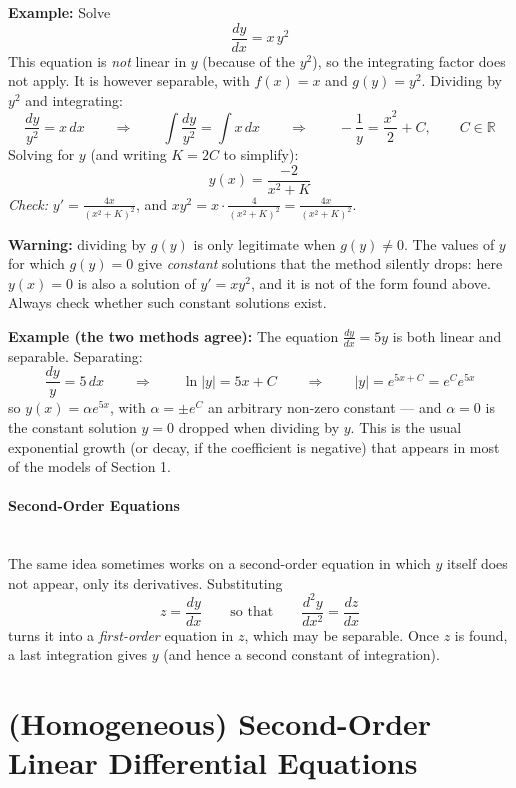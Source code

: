 \documentclass[]{article}
\newcommand{\R}{\mathbb{R}}
\begin{document}
	\noindent \textbf{Example:}
	Solve
	$$
	\frac{dy}{dx} = x \, y^2
	$$
	This equation is \textit{not} linear in $y$ (because of the $y^2$), so the integrating factor does not apply.
	It is however separable, with $f(x) = x$ and $g(y) = y^2$.
	Dividing by $y^2$ and integrating:
	$$
	\frac{dy}{y^2} = x \, dx
	\qquad \Longrightarrow \qquad
	\int \frac{dy}{y^2} = \int x \, dx
	\qquad \Longrightarrow \qquad
	-\frac{1}{y} = \frac{x^2}{2} + C, \qquad C \in \R
	$$
	Solving for $y$ (and writing $K = 2C$ to simplify):
	$$
	y(x) = \frac{-2}{x^2 + K}
	$$
	\textit{Check:} $y' = \frac{4x}{(x^2+K)^2}$, and $x y^2 = x \cdot \frac{4}{(x^2+K)^2} = \frac{4x}{(x^2+K)^2}$. \checkmark

	\noindent \textbf{Warning:}
	dividing by $g(y)$ is only legitimate when $g(y) \neq 0$.
	The values of $y$ for which $g(y) = 0$ give \textit{constant} solutions that the method silently drops:
	here $y(x) = 0$ is also a solution of $y' = xy^2$, and it is not of the form found above.
	Always check whether such constant solutions exist.

	\noindent \textbf{Example (the two methods agree):}
	The equation $\frac{dy}{dx} = 5y$ is both linear and separable.
	Separating:
	$$
	\frac{dy}{y} = 5 \, dx
	\qquad \Longrightarrow \qquad
	\ln|y| = 5x + C
	\qquad \Longrightarrow \qquad
	|y| = e^{5x + C} = e^{C} e^{5x}
	$$
	so $y(x) = \alpha e^{5x}$, with $\alpha = \pm e^{C}$ an arbitrary non-zero constant --- and $\alpha = 0$ is the constant solution $y = 0$ dropped when dividing by $y$.
	This is the usual exponential growth (or decay, if the coefficient is negative) that appears in most of the models of Section 1.

	\paragraph{Second-Order Equations}
	\noindent\\
	The same idea sometimes works on a second-order equation in which $y$ itself does not appear, only its derivatives.
	Substituting
	$$
	z = \frac{dy}{dx}
	\qquad \text{so that} \qquad
	\frac{d^2y}{dx^2} = \frac{dz}{dx}
	$$
	turns it into a \textit{first-order} equation in $z$, which may be separable.
	Once $z$ is found, a last integration gives $y$ (and hence a second constant of integration).

	\section{(Homogeneous) Second-Order Linear Differential Equations}
	
\end{document}

